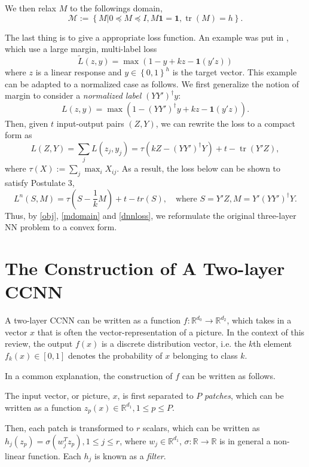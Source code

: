 \documentclass{article}
\DeclareMathOperator{\tr}{tr}
\begin{document}
We then relax $M$ to the followings domain,
\begin{equation}\label{mdomain}
	\mathcal{M}:=\left\lbrace M|0\preceq M\preceq I,M\mathbf{1}=\mathbf{1},\tr(M)=h\right\rbrace.
\end{equation}

The last thing is to give a appropriate loss function. An example was put in \cite{aslan2013convex}, which use a large margin, multi-label loss
\[\tilde{L}(z,y)=\max(1-y+kz-\mathbf{1}(y'z))\]
where $z$ is a linear response and $y\in\left\lbrace 0,1\right\rbrace^h $ is the target vector. This example can be adapted to a normalized case as follows. We first generalize the notion of margin to consider a \emph{normalized label} $(YY')^\dagger y$:
\[L(z,y)=\max(1-(YY')^\dagger y+kz-\mathbf{1}(y'z)).\]
Then, given $t$ input-output pairs $(Z,Y)$, we can rewrite the loss to a compact form as
\[L(Z,Y)=\sum_jL(z_j,y_j)= \tau(kZ−(YY')^\dagger Y)+t−\tr(Y'Z),\]
where $\tau(X):=\sum_j\max_i X_{ij}$. As a result, the loss below can be shown to satisfy Postulate 3,
\begin{equation}\label{dnnloss}
L^n(S,M)=\tau(S-\frac{1}{k}M)+t-tr(S),\quad\text{where }S=Y'Z,M=Y'(YY')^\dagger Y.
\end{equation}
Thus, by \eqref{obj}, \eqref{mdomain} and \eqref{dnnloss}, we reformulate the original three-layer NN problem to a convex form.

\section{The Construction of A Two-layer CCNN}
A two-layer CCNN can be written as a function $f:\mathbb{R}^{d_0}\rightarrow\mathbb{R}^{d_2}$, which takes in a vector $x$ that is often the vector-representation of a picture. In the context of this review, the output $f(x)$ is a discrete distribution vector, i.e. the $k$th element $f_k(x)\in\left[0,1\right] $ denotes the probability of $x$ belonging to class $k$.

In a common explanation, the construction of $f$ can be written as follows.

The input vector, or picture, $x$, is first separated to $P$ \emph{patches}, which can be written as a function $z_p(x)\in\mathbb{R}^{d_1},1\leq p\leq P$.

Then, each patch is transformed to $r$ scalars, which can be written as $h_j(z_p)=\sigma(w_j^Tz_p),1\leq j\leq r$, where $w_j\in\mathbb{R}^{d_1}$, $\sigma:\mathbb{R}\rightarrow\mathbb{R}$ is in general a non-linear function. Each $h_j$ is known as a \emph{filter}.
\end{document}
